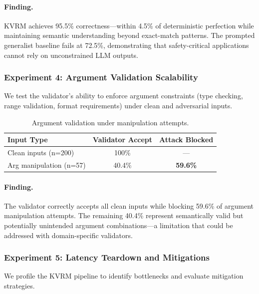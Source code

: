 \documentclass[11pt]{article}
\begin{document}
\paragraph{Finding.} KVRM achieves 95.5\% correctness---within 4.5\% of deterministic perfection while maintaining semantic understanding beyond exact-match patterns. The prompted generalist baseline fails at 72.5\%, demonstrating that safety-critical applications cannot rely on unconstrained LLM outputs.

\subsubsection{Experiment 4: Argument Validation Scalability}

We test the validator's ability to enforce argument constraints (type checking, range validation, format requirements) under clean and adversarial inputs.

\begin{table}[h]
\centering
\caption{Argument validation under manipulation attempts.}
\label{tab:exp4_args}
\begin{tabular}{lcc}
\toprule
Input Type & Validator Accept & Attack Blocked \\
\midrule
Clean inputs (n=200) & 100\% & --- \\
Arg manipulation (n=57) & 40.4\% & \textbf{59.6\%} \\
\bottomrule
\end{tabular}
\end{table}

\paragraph{Finding.} The validator correctly accepts all clean inputs while blocking 59.6\% of argument manipulation attempts. The remaining 40.4\% represent semantically valid but potentially unintended argument combinations---a limitation that could be addressed with domain-specific validators.

\subsubsection{Experiment 5: Latency Teardown and Mitigations}

We profile the KVRM pipeline to identify bottlenecks and evaluate mitigation strategies.
\end{document}
